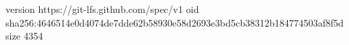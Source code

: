 version https://git-lfs.github.com/spec/v1
oid sha256:4646514e0d4074de7dde62b58930e58d2693e3bd5cb38312b184774503af8f5d
size 4354
